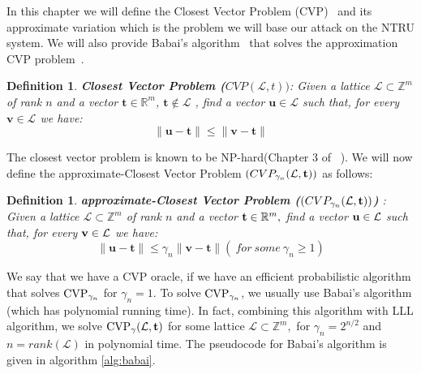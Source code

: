 \documentclass{amsart}
\newtheorem{definition}[theorem]{Definition}
\numberwithin{equation}{section}
\def\L{\mathcal{L}}
\begin{document}
In this chapter we will define the Closest Vector Problem (CVP)~\cite{gal} and its approximate variation which is the problem we will base our attack on the NTRU system. We will also provide Babai's algorithm~\cite{gal} that solves the approximation CVP problem~\cite{gal}.

\begin{definition}
\textbf{Closest Vector Problem ($CVP(\L,t))$}:  Given a lattice $\mathcal{L}\subset {\mathbb{Z}}^m$ of rank $n$ and a vector $\textbf{t} \in {\mathbb{R}}^m$, $\textbf{t} \notin \L$ , find a vector $\textbf{u} \in \mathcal{L}$ such that, for every ${\textbf{v}} \in \mathcal{L}$ we have:
$$\| \textbf{u} - \textbf{t} \| \leq \| \textbf{v} - \textbf{t} \|$$
\end{definition}

The closest vector problem is known to be NP-hard(Chapter 3 of ~\cite{COMPLEXITY_OF_LATTICE_PROBLEMS}). We will now define the approximate-Closest Vector Problem $(CVP_{\gamma_{n}}({\mathcal{L}},{\textbf t}))$ as follows:

\begin{definition}
\textbf{approximate-Closest Vector Problem ($(CVP_{\gamma_{n}}({\mathcal{L}},{\textbf t}))$) }: Given a lattice $\mathcal{L}\subset {\mathbb{Z}}^m$ of rank $n$ and a vector ${\textbf t}\in {\mathbb{R}}^m,$ find a vector ${\textbf u}\in \mathcal{L}$ such that, for every ${\textbf v}\in \mathcal{L}$ we have:
$$ \| \textbf{u} - \textbf{t} \| \leq \gamma_n \| \textbf{v} - \textbf{t} \| ( \ for \ some \ \gamma_n \geq 1)$$
\end{definition}

We say that we have a CVP oracle, if we have an efficient probabilistic algorithm that solves ${\rm CVP}_{\gamma_n}$ for $\gamma_n=1.$ To solve 
${\rm{CVP}}_{\gamma_n}$, we usually use Babai's algorithm \cite[Chapter 18]{gal} (which has polynomial running time). In fact, combining this algorithm with LLL algorithm, we solve ${\rm{CVP}}_{\gamma}(\mathcal{L},{\textbf t})$ for some lattice $\mathcal{L}\subset {\mathbb{Z}}^m,$ for $\gamma_n = 2^{n/2}$ and $n=rank(\mathcal{L})$ in polynomial time. The pseudocode for Babai's algorithm is given in algorithm \ref{alg:babai}.
 
\end{document}
